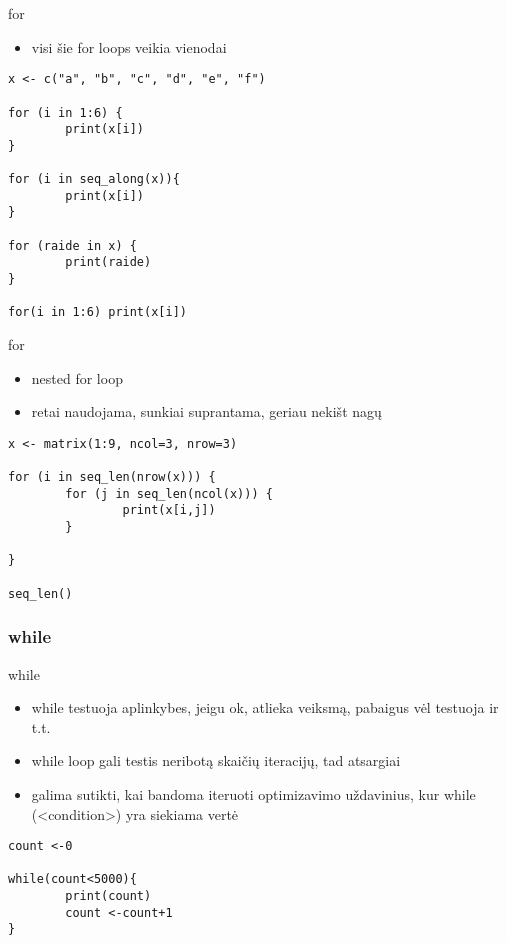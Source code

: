 \documentclass[11pt,xcolor=table]{beamer}
\begin{document}

\begin{frame}[fragile]{for}
\begin{itemize}
\item visi šie for loops veikia vienodai
\end{itemize}
\begin{lstlisting}
x <- c("a", "b", "c", "d", "e", "f")

for (i in 1:6) {
        print(x[i])
}

for (i in seq_along(x)){
        print(x[i])
}

for (raide in x) {
        print(raide)
}

for(i in 1:6) print(x[i])
\end{lstlisting}
\end{frame}


\begin{frame}[fragile]{for}
\begin{itemize}
\item nested for loop
\item retai naudojama, sunkiai suprantama, geriau nekišt nagų 
\end{itemize}
\begin{lstlisting}
x <- matrix(1:9, ncol=3, nrow=3)

for (i in seq_len(nrow(x))) {
        for (j in seq_len(ncol(x))) {
                print(x[i,j])
        }
        
}

seq_len() 
\end{lstlisting}
\end{frame}

\subsubsection{while}
\begin{frame}[fragile]{while}
\begin{itemize}
\item while testuoja aplinkybes, jeigu ok, atlieka veiksmą, pabaigus vėl testuoja ir t.t. 
\item while loop gali testis neribotą skaičių iteracijų, tad atsargiai
\item galima sutikti, kai bandoma iteruoti optimizavimo uždavinius, kur while (<condition>) yra siekiama vertė
\end{itemize}
\begin{lstlisting}
count <-0

while(count<5000){
        print(count)
        count <-count+1
}

\end{lstlisting}
\end{frame}
\end{document}
